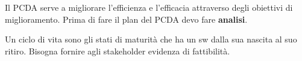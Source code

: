 Il PCDA serve a migliorare l'efficienza e l'efficacia attraverso degli obiettivi di miglioramento. Prima di fare il plan del PCDA devo fare \textbf{analisi}. 

Un ciclo di vita sono gli stati di maturità che ha un sw dalla sua nascita al suo ritiro. Bisogna fornire agli stakeholder evidenza di fattibilità.